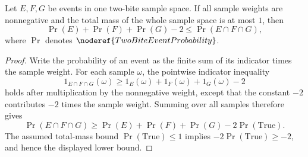 \begin{helper}
Let \(E,F,G\) be events in one two-bite sample space.  If all sample weights
are nonnegative and the total mass of the whole sample space is at most \(1\),
then
\[
\Pr(E)+\Pr(F)+\Pr(G)-2 \le \Pr(E\cap F\cap G),
\]
where \(\Pr\) denotes \(\noderef{TwoBiteEventProbability}\).
\end{helper}
\begin{proof}
Write the probability of an event as the finite sum of its indicator times the
sample weight.  For each sample \(\omega\), the pointwise indicator inequality
\[
1_{E\cap F\cap G}(\omega)
\ge 1_E(\omega)+1_F(\omega)+1_G(\omega)-2
\]
holds after multiplication by the nonnegative weight, except that the constant
\(-2\) contributes \(-2\) times the sample weight.  Summing over all samples
therefore gives
\[
\Pr(E\cap F\cap G)\ge
\Pr(E)+\Pr(F)+\Pr(G)-2\Pr(\mathrm{True}).
\]
The assumed total-mass bound \(\Pr(\mathrm{True})\le1\) implies
\(-2\Pr(\mathrm{True})\ge-2\), and hence the displayed lower bound.
\end{proof}
